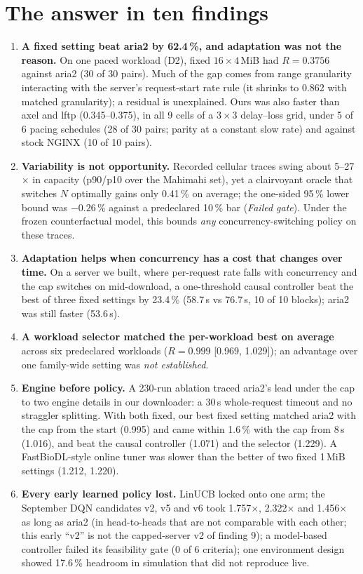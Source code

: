 \section{The answer in ten findings}
\begin{enumerate}
\item \textbf{A fixed setting beat aria2 by 62.4\,\%, and adaptation was not the reason.} On one paced workload (D2), fixed $16\times4$\,MiB had $R = 0.3756$ against aria2 (30 of 30 pairs). Much of the gap comes from range granularity interacting with the server's request-start rate rule (it shrinks to 0.862 with matched granularity); a residual is unexplained. Ours was also faster than axel and lftp (0.345--0.375), in all 9 cells of a $3\times3$ delay--loss grid, under 5 of 6 pacing schedules (28 of 30 pairs; parity at a constant slow rate) and against stock NGINX (10 of 10 pairs).
\item \textbf{Variability is not opportunity.} Recorded cellular traces swing about 5--27$\times$ in capacity (p90/p10 over the Mahimahi set), yet a clairvoyant oracle that switches $N$ optimally gains only 0.41\,\% on average; the one-sided 95\,\% lower bound was $-0.26$\,\% against a predeclared 10\,\% bar (\emph{Failed gate}). Under the frozen counterfactual model, this bounds \emph{any} concurrency-switching policy on these traces.
\item \textbf{Adaptation helps when concurrency has a cost that changes over time.} On a server we built, where per-request rate falls with concurrency and the cap switches on mid-download, a one-threshold causal controller beat the best of three fixed settings by 23.4\,\% (58.7\,s vs 76.7\,s, 10 of 10 blocks); aria2 was still faster (53.6\,s).
\item \textbf{A workload selector matched the per-workload best on average} across six predeclared workloads ($R = 0.999$ [0.969, 1.029]); an advantage over one family-wide setting was \emph{not established}.
\item \textbf{Engine before policy.} A 230-run ablation traced aria2's lead under the cap to two engine details in our downloader: a 30\,s whole-request timeout and no straggler splitting. With both fixed, our best fixed setting matched aria2 with the cap from the start (0.995) and came within 1.6\,\% with the cap from 8\,s (1.016), and beat the causal controller (1.071) and the selector (1.229). A FastBioDL-style online tuner was slower than the better of two fixed 1\,MiB settings (1.212, 1.220).
\item \textbf{Every early learned policy lost.} LinUCB locked onto one arm; the September DQN candidates v2, v5 and v6 took 1.757$\times$, 2.322$\times$ and 1.456$\times$ as long as aria2 (in head-to-heads that are not comparable with each other; this early ``v2'' is not the capped-server v2 of finding 9); a model-based controller failed its feasibility gate (0 of 6 criteria); one environment design showed 17.6\,\% headroom in simulation that did not reproduce live.

\end{enumerate}
